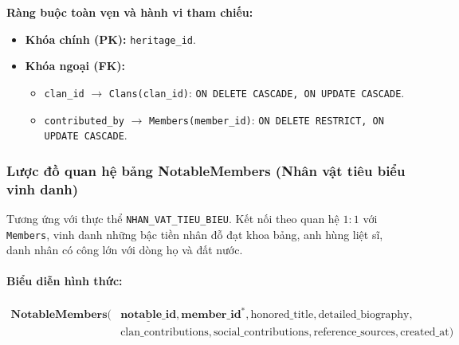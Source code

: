 \noindent\textbf{Ràng buộc toàn vẹn và hành vi tham chiếu:}
\begin{itemize}[noitemsep,topsep=2pt]
    \item \textbf{Khóa chính (PK):} \texttt{heritage\_id}.
    \item \textbf{Khóa ngoại (FK):}
    \begin{itemize}[noitemsep]
        \item \texttt{clan\_id} $\rightarrow$ \texttt{Clans(clan\_id)}: \texttt{ON DELETE CASCADE, ON UPDATE CASCADE}.
        \item \texttt{contributed\_by} $\rightarrow$ \texttt{Members(member\_id)}: \texttt{ON DELETE RESTRICT, ON UPDATE CASCADE}.
    \end{itemize}
\end{itemize}

\subsubsection{Lược đồ quan hệ bảng NotableMembers (Nhân vật tiêu biểu vinh danh)}
Tương ứng với thực thể \texttt{NHAN\_VAT\_TIEU\_BIEU}. Kết nối theo quan hệ $1:1$ với \texttt{Members}, vinh danh những bậc tiền nhân đỗ đạt khoa bảng, anh hùng liệt sĩ, danh nhân có công lớn với dòng họ và đất nước.

\paragraph{Biểu diễn hình thức:}
\[
\begin{aligned}
\textbf{NotableMembers}\big(
&\underline{\textbf{notable\_id}}, \textbf{member\_id}^*, \text{honored\_title}, \text{detailed\_biography}, \\
&\text{clan\_contributions}, \text{social\_contributions}, \text{reference\_sources}, \text{created\_at}
\big)
\end{aligned}
\]

